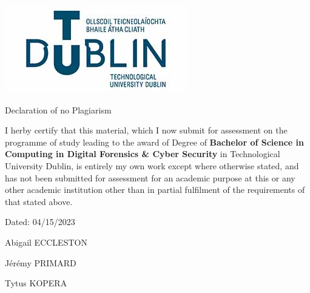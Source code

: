 \documentclass[../main.tex]{subfiles}
\begin{document}
\begin{PageVierge}

	\includegraphics[height=0.25\textwidth]{tu_dublin_logo.jpg}

	\begin{center}
		\fontsize{14}{18} 
		\selectfont
		\bf

        Declaration of no Plagiarism

	\end{center}

	\vspace{3.5cm}


    I herby certify that this material, which I now submit for assessment on the programme of study leading to the award of Degree of \textbf{Bachelor of Science in Computing in Digital Forensics \& Cyber Security} in Technological University Dublin, is entirely my own work except where otherwise stated, and has not been submitted for assessment for an academic purpose at this or any other academic institution other than in partial fulfilment of the requirements of that stated above.




	\vspace{1cm}

	Dated: 04/15/2023


	\begin{flushright}

        Abigail ECCLESTON

        Jérémy PRIMARD
        
        Tytus KOPERA

	\end{flushright}


\end{PageVierge}
\end{document}
